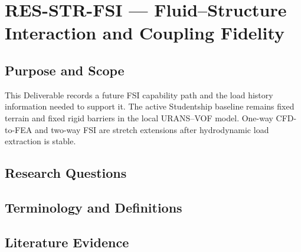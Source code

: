 
\section{RES-STR-FSI --- Fluid–Structure Interaction and Coupling Fidelity}
\label{sec:res-str-fsi}

\subsection{Purpose and Scope}
\label{sec:res-str-fsi-purpose}

This Deliverable records a future FSI capability path and the load
history information needed to support it. The active Studentship
baseline remains fixed terrain and fixed rigid barriers in the local
URANS--VOF model. One-way CFD-to-FEA and two-way FSI are stretch
extensions after hydrodynamic load extraction is stable.

\subsection{Research Questions}
\label{sec:res-str-fsi-research-questions}


\subsection{Terminology and Definitions}
\label{sec:res-str-fsi-definitions}


\subsection{Literature Evidence}
\label{sec:res-str-fsi-literature-evidence}

